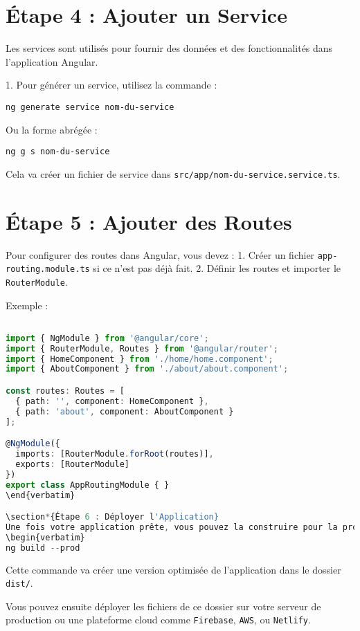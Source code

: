 \documentclass{article}
\begin{document}
\section*{Étape 4 : Ajouter un Service}
Les services sont utilisés pour fournir des données et des fonctionnalités dans l'application Angular.

1. Pour générer un service, utilisez la commande :
\begin{verbatim}
ng generate service nom-du-service
\end{verbatim}
Ou la forme abrégée :
\begin{verbatim}
ng g s nom-du-service
\end{verbatim}

Cela va créer un fichier de service dans \texttt{src/app/nom-du-service.service.ts}.

\section*{Étape 5 : Ajouter des Routes}
Pour configurer des routes dans Angular, vous devez :
1. Créer un fichier \texttt{app-routing.module.ts} si ce n'est pas déjà fait.
2. Définir les routes et importer le \texttt{RouterModule}.

Exemple :
\begin{lstlisting}[language=TypeScript, caption={Using a service in a component}, label={lst:typescript-service-usage}]

import { NgModule } from '@angular/core';
import { RouterModule, Routes } from '@angular/router';
import { HomeComponent } from './home/home.component';
import { AboutComponent } from './about/about.component';

const routes: Routes = [
  { path: '', component: HomeComponent },
  { path: 'about', component: AboutComponent }
];

@NgModule({
  imports: [RouterModule.forRoot(routes)],
  exports: [RouterModule]
})
export class AppRoutingModule { }
\end{verbatim}

\section*{Étape 6 : Déployer l'Application}
Une fois votre application prête, vous pouvez la construire pour la production en exécutant la commande suivante :
\begin{verbatim}
ng build --prod
\end{lstlisting}

Cette commande va créer une version optimisée de l'application dans le dossier \texttt{dist/}.

Vous pouvez ensuite déployer les fichiers de ce dossier sur votre serveur de production ou une plateforme cloud comme \texttt{Firebase}, \texttt{AWS}, ou \texttt{Netlify}.
\end{document}
